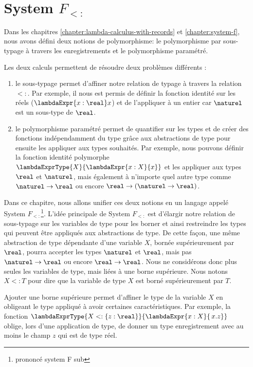 \chapter{System $F_{<:}$}
\label{chapter:system-f-sub}

Dans les chapitres \ref{chapter:lambda-calculus-with-records} et
\ref{chapter:system-f}, nous avons défini deux notions de polymorphisme: le
polymorphisme par sous-typage à travers les enregistrements et le polymorphisme
paramétré.

Les deux calculs permettent de résoudre deux problèmes différents :
\begin{enumerate}
  \item le sous-typage permet d'affiner notre relation de typage à travers la
    relation $<:$. Par exemple, il nous est permis de définir la fonction
    identité sur les réels ($\lambdaExpr{x : \real} x$) et de l'appliquer à un
    entier car $\naturel$ est un sous-type de $\real$.
  \item le polymorphisme paramétré permet de quantifier sur les types et de
    créer des fonctions indépendamment du type grâce aux abstractions de type
    pour ensuite les appliquer aux types souhaités. Par exemple, nous pouvons
    définir la fonction identité polymorphe $\lambdaExprType{X}{\lambdaExpr{x :
    X}{x}}$ et les appliquer aux types $\real$ et $\naturel$, mais également à
    n'importe quel autre type comme $\naturel \rightarrow \real$ ou encore $\real
    \rightarrow (\naturel \rightarrow \real)$.
\end{enumerate}

Dans ce chapitre, nous allons unifier ces deux notions en un langage appelé
System $F_{<:}$\footnote{prononcé \og system F sub \fg}. L'idée principale de
System $F_{<:}$ est d'élargir notre relation de sous-typage sur les variables de
type pour les borner et ainsi restreindre les types qui peuvent être appliqués
aux abstractions de type. De cette façon, une même abstraction de type dépendante d'une
variable $X$, bornée supérieurement par $\real$, pourra accepter les types $\naturel$ et
$\real$, mais pas $\naturel \rightarrow \real$ ou encore $\real \rightarrow
\real$. Nous ne considérons donc plus seules les variables de type, mais liées
à une borne supérieure. Nous notons $X <: T$ pour dire que la variable de type
$X$ est borné supérieurement par $T$.  

Ajouter une borne supérieure permet d'affiner le type de la variable $X$ en
obligeant le type appliqué à avoir certaines caractéristiques. Par exemple, la
fonction $\lambdaExprType{X <: \left\{ z : \real \right\}}{\lambdaExpr{x :
    X}{\, x.z}}$ oblige, lors d'une application de type, de donner un type
enregistrement avec au moins le champ $z$ qui est de type réel.

